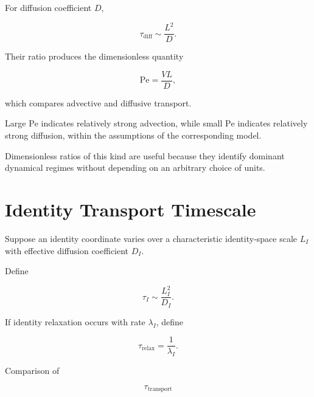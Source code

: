 \documentclass[12pt,oneside]{book}
\begin{document}
For diffusion coefficient \(D\),

\begin{equation}
    \tau_{\mathrm{diff}}
    \sim
    \frac{L^2}{D}.
    \label{eq:diffusive-timescale}
\end{equation}

Their ratio produces the dimensionless quantity

\begin{equation}
    \mathrm{Pe}
    =
    \frac{VL}{D},
    \label{eq:peclet-number}
\end{equation}

which compares advective and diffusive transport.

Large \(\mathrm{Pe}\) indicates relatively strong advection,
while small \(\mathrm{Pe}\) indicates relatively strong
diffusion, within the assumptions of the corresponding model.

Dimensionless ratios of this kind are useful because they
identify dominant dynamical regimes without depending on an
arbitrary choice of units.


\section{Identity Transport Timescale}
\label{sec:identity-transport-timescale}

Suppose an identity coordinate varies over a characteristic
identity-space scale \(L_I\) with effective diffusion
coefficient \(D_I\).

Define

\begin{equation}
    \tau_I
    \sim
    \frac{L_I^2}{D_I}.
    \label{eq:identity-diffusion-timescale}
\end{equation}

If identity relaxation occurs with rate \(\lambda_I\), define

\begin{equation}
    \tau_{\mathrm{relax}}
    =
    \frac{1}{\lambda_I}.
    \label{eq:identity-relaxation-timescale}
\end{equation}

Comparison of

\begin{equation}
    \tau_{\mathrm{transport}}
\end{equation}
\end{document}
